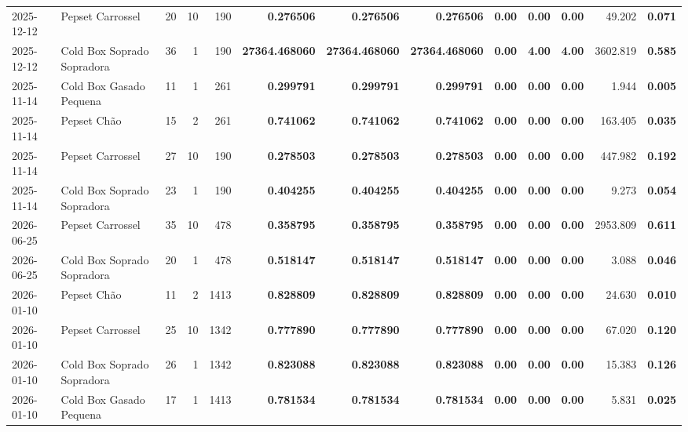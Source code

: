 {\begin{center}
{\begin{tabular}{@{}llrrrrrrrrrrr@{}}
2025-12-12 & Pepset Carrossel & 20 & 10 & 190 & \textbf{0.276506} & \textbf{0.276506} & \textbf{0.276506} & \textbf{0.00} & \textbf{0.00} & \textbf{0.00} & 49.202 & \textbf{0.071} \\
2025-12-12 & Cold Box Soprado Sopradora & 36 & 1 & 190 & \textbf{27364.468060} & \textbf{27364.468060} & \textbf{27364.468060} & \textbf{0.00} & \textbf{4.00} & \textbf{4.00} & 3602.819 & \textbf{0.585} \\
2025-11-14 & Cold Box Gasado Pequena & 11 & 1 & 261 & \textbf{0.299791} & \textbf{0.299791} & \textbf{0.299791} & \textbf{0.00} & \textbf{0.00} & \textbf{0.00} & 1.944 & \textbf{0.005} \\
2025-11-14 & Pepset Chão & 15 & 2 & 261 & \textbf{0.741062} & \textbf{0.741062} & \textbf{0.741062} & \textbf{0.00} & \textbf{0.00} & \textbf{0.00} & 163.405 & \textbf{0.035} \\
2025-11-14 & Pepset Carrossel & 27 & 10 & 190 & \textbf{0.278503} & \textbf{0.278503} & \textbf{0.278503} & \textbf{0.00} & \textbf{0.00} & \textbf{0.00} & 447.982 & \textbf{0.192} \\
2025-11-14 & Cold Box Soprado Sopradora & 23 & 1 & 190 & \textbf{0.404255} & \textbf{0.404255} & \textbf{0.404255} & \textbf{0.00} & \textbf{0.00} & \textbf{0.00} & 9.273 & \textbf{0.054} \\
2026-06-25 & Pepset Carrossel & 35 & 10 & 478 & \textbf{0.358795} & \textbf{0.358795} & \textbf{0.358795} & \textbf{0.00} & \textbf{0.00} & \textbf{0.00} & 2953.809 & \textbf{0.611} \\
2026-06-25 & Cold Box Soprado Sopradora & 20 & 1 & 478 & \textbf{0.518147} & \textbf{0.518147} & \textbf{0.518147} & \textbf{0.00} & \textbf{0.00} & \textbf{0.00} & 3.088 & \textbf{0.046} \\
2026-01-10 & Pepset Chão & 11 & 2 & 1413 & \textbf{0.828809} & \textbf{0.828809} & \textbf{0.828809} & \textbf{0.00} & \textbf{0.00} & \textbf{0.00} & 24.630 & \textbf{0.010} \\
2026-01-10 & Pepset Carrossel & 25 & 10 & 1342 & \textbf{0.777890} & \textbf{0.777890} & \textbf{0.777890} & \textbf{0.00} & \textbf{0.00} & \textbf{0.00} & 67.020 & \textbf{0.120} \\
2026-01-10 & Cold Box Soprado Sopradora & 26 & 1 & 1342 & \textbf{0.823088} & \textbf{0.823088} & \textbf{0.823088} & \textbf{0.00} & \textbf{0.00} & \textbf{0.00} & 15.383 & \textbf{0.126} \\
2026-01-10 & Cold Box Gasado Pequena & 17 & 1 & 1413 & \textbf{0.781534} & \textbf{0.781534} & \textbf{0.781534} & \textbf{0.00} & \textbf{0.00} & \textbf{0.00} & 5.831 & \textbf{0.025} \\
\bottomrule
\end{tabular}%
}
\end{center}
}
